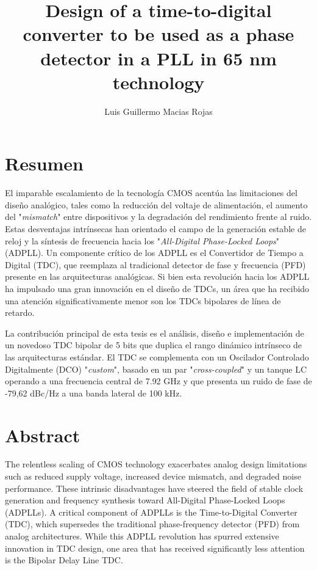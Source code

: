 \documentclass[twoside, 12pt]{report}   %
\title{Design of a time-to-digital converter to be used as a phase detector in a PLL in 65 nm technology}
\author{Luis Guillermo Macias Rojas}
\theoremstyle{mytheoremstyle}
\theoremstyle{mytheoremstyle}
\theoremstyle{myproblemstyle}
\begin{document}
    \begin{titlepage}
    \end{titlepage}

    \selectfont %
    \chapter*{Resumen}
    El imparable escalamiento de la tecnología CMOS acentúa las limitaciones del diseño analógico, tales como la reducción del voltaje de alimentación, el aumento del "\textit{mismatch}"
    entre dispositivos y la degradación del rendimiento frente al ruido. Estas desventajas intrínsecas han orientado el campo de la generación estable de reloj y la síntesis de frecuencia
    hacia los "\textit{All-Digital Phase-Locked Loops}" (ADPLL). Un componente crítico de los ADPLL es el Convertidor de Tiempo a Digital (TDC), que reemplaza al tradicional detector de
    fase y frecuencia (PFD) presente en las arquitecturas analógicas. Si bien esta revolución hacia los ADPLL ha impulsado una gran innovación en el diseño de TDCs, un área que ha
    recibido una atención significativamente menor son los TDCs bipolares de línea de retardo.

    La contribución principal de esta tesis es el análisis, diseño e implementación de un novedoso TDC bipolar de 5 bits que duplica el rango dinámico intrínseco de las arquitecturas estándar.
    El TDC se complementa con un Oscilador Controlado Digitalmente (DCO) "\textit{custom}", basado en un par "\textit{cross-coupled}" y un tanque LC operando a una frecuencia central de
    7.92 GHz y que presenta un ruido de fase de -79,62 dBc/Hz a una banda lateral de 100 kHz.

    \chapter*{Abstract}
    The relentless scaling of CMOS technology exacerbates analog design limitations such as reduced supply voltage, increased device mismatch, and degraded noise performance. These
    intrinsic disadvantages have steered the field of stable clock generation and frequency synthesis toward All-Digital Phase-Locked Loops (ADPLLs). A critical component of ADPLLs is
    the Time-to-Digital Converter (TDC), which supersedes the traditional phase-frequency detector (PFD) from analog architectures. While this ADPLL revolution has spurred extensive
    innovation in TDC design, one area that has received significantly less attention is the Bipolar Delay Line TDC.
\end{document}
